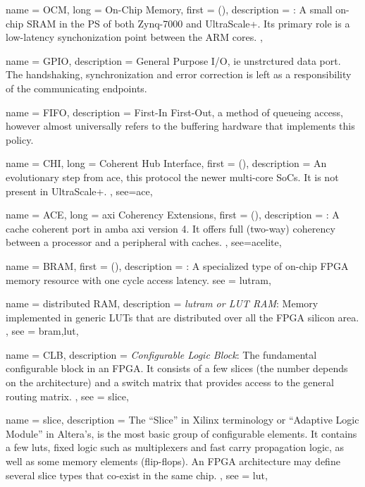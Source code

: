 {
	name = {OCM},
	long = {On-Chip Memory},
	first = { ()},
	description = {\emph{}:
		A small on-chip SRAM in the PS of both Zynq-7000 and UltraScale+.
		Its primary role is a low-latency synchonization point between the ARM cores.
	},
}

{
	name = {GPIO},
	description = {
		General Purpose I/O, ie unstrctured data port. 
		The handshaking, synchronization and error correction
		is left as a responsibility of the communicating endpoints.
	}
}

{
	name = {FIFO},
	description = {
		First-In First-Out, a method of queueing access,
		however almost universally refers to the buffering hardware
		that implements this policy.
	}
}


{
	name = {CHI},
	long = {Coherent Hub Interface},
	first = { ()},
	description = {
		An evolutionary step from \gls{ace}, this protocol the newer multi-core SoCs.
		It is not present in UltraScale+.
	},
	see={ace},
}

{
	name = {ACE},
	long = {\gls{axi} Coherency Extensions},
	first = { ()},
	description = {\emph{}:
		A cache coherent port in \gls{amba} \gls{axi} version 4. It offers full (two-way)
		coherency between a processor and a peripheral with caches.
	},
	see={acelite},
}

{
	name = {BRAM},
	first = { ()},
	description = {\emph{}:
		A specialized type of on-chip FPGA memory resource with one cycle access latency.
	}
	see = {lutram},
}

{
	name = {distributed RAM},
	description = {\emph{\Gls{lutram} or LUT RAM}:
		Memory implemented in generic LUTs that are distributed over all the FPGA silicon area.
	},
	see = {bram,lut},
}


{
	name = {CLB},
	description = {\emph{Configurable Logic Block}:
		The fundamental configurable block in an FPGA. It consists of a few \Glspl{slice}
		(the number depends on the architecture) and a switch matrix that provides
		access to the general routing matrix.
	},
	see = {slice},
}

{
	name = {slice},
	description = {
		The ``Slice'' in Xilinx terminology or ``Adaptive Logic Module'' in Altera's,
		is the most basic group of configurable elements. It contains a few \glspl{lut},
		fixed logic such as multiplexers and fast carry propagation logic, as well as
		some memory elements (flip-flops). An FPGA architecture may define several slice types
		that co-exist in the same chip.
	},
	see = {lut},
}

